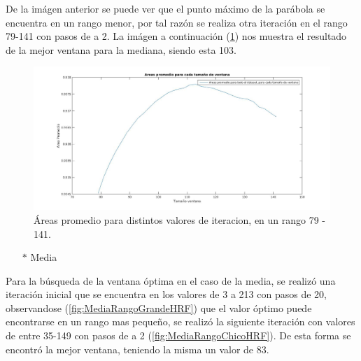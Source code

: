 De la im\'agen anterior se puede ver que el punto m\'aximo de la par\'abola se encuentra en un rango menor, por tal raz\'on se realiza otra iteraci\'on en el rango 79-141 con pasos de a 2. La im\'agen a continuaci\'on (\ref{fig:MedianaRangoChicoHRF}) nos muestra el resultado de la mejor ventana para la mediana, siendo esta 103.\\


\begin{figure}[H]
	{
	\centering
	\includegraphics[width=1\textwidth]{Figures/MedianaRangoChicoHRF}
	\caption[Mediana HRF]{\'Areas promedio para distintos valores de iteracion, en un rango 79 - 141.}
	\label{fig:MedianaRangoChicoHRF}
	}
\end{figure}



\begin{itemize}
	\item[$*$]Media
\end{itemize}

Para la b\'usqueda de la ventana \'optima en el caso de la media, se realiz\'o una iteraci\'on inicial que se encuentra en los valores de 3 a 213 con pasos de 20, observandose (\ref{fig:MediaRangoGrandeHRF}) que el valor \'optimo puede encontrarse en un rango mas pequeño, se realiz\'o la siguiente iteraci\'on con valores de entre 35-149 con pasos de a 2 (\ref{fig:MediaRangoChicoHRF}). De esta forma se encontr\'o la mejor ventana, teniendo la misma un valor de 83.

